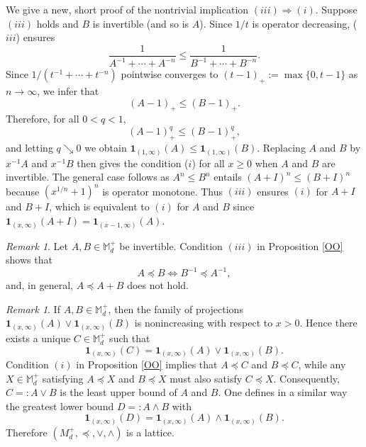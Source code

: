 \documentclass[12pt,reqno]{article}
\theoremstyle{definition}
\theoremstyle{remark}
\newtheorem{remark}[theorem]{Remark}
\numberwithin{equation}{section}
\def\ind{\mathbf{1}}
\def\bM{\mathbb{M}}
\begin{document}
We give a new, short  proof of the nontrivial implication $(iii)\Rightarrow (i)$. Suppose $(iii)$ holds and  $B$ is invertible (and so is $A$).  Since $1/t$ is operator decreasing, ($iii$) ensures
$$
\frac{1}{A^{-1}+\cdots+A^{-n}} \le \frac{1}{B^{-1}+\cdots+B^{-n}}.
$$
Since $1/(t^{-1}+\cdots+ t^{-n})$ pointwise converges to $(t-1)_+:=\max\{0, t-1\}$ as $n\to\infty$, we infer that
$$
(A-1)_+ \le (B-1)_+.
$$
Therefore, for all $0<q<1$,
$$
(A-1)^q_+ \le (B-1)^q_+,
$$
and letting $q\searrow 0$ we obtain $\ind_{(1,\infty)}(A)\le \ind_{(1,\infty)}(B)$. Replacing $A$ and $B$ by $x^{-1}A$ and $x^{-1}B$ then gives the condition ($i$) for all $x\ge 0$ when $A$ and $B$ are invertible. The general case follows as $A^n\le B^n$ entails $(A+ I)^n\le (B+ I)^n$ because $(x^{1/n}+1)^n$ is operator monotone. Thus $(iii)$ ensures $(i)$ for $A+ I$ and  $B+ I$, which is equivalent to $(i)$ for $A$ and $B$ since $\ind_{(x,\infty)}(A+I)=
\ind_{(x-1,\infty)}(A)$.
 


\vskip 5pt
\begin{remark} Let $A,B\in\bM_d^+$ be invertible. Condition $(iii)$ in Proposition \ref{OO} shows that
$$
A\preceq B \iff B^{-1}\preceq A^{-1},
$$
and, in general, $A\preceq A+B$ does not hold.
\end{remark}

\vskip 5pt
\begin{remark} If $A,B\in\bM_d^+$, then the family of projections $\ind_{(x,\infty)}(A) \vee  \ind_{(x,\infty)}(B)$ is nonincreasing with respect to $x>0$. Hence there exists a unique $C\in\bM_d^+$ such that
$$
\ind_{(x,\infty)}(C)=\ind_{(x,\infty)}(A) \vee  \ind_{(x,\infty)}(B).
$$
Condition $(i)$ in Proposition \ref{OO} implies that $A\preceq C$ and $B\preceq C$, while any $X\in\mathbb M_d^+$ satisfying $A\preceq X$ and $B\preceq X$ must also satisfy $C\preceq X$.
 Consequently, $C=:A\vee  B$ is the least upper bound of $A$ and $B$. One defines in a similar way the greatest lower bound $D=:A\wedge B$ with
$$
\ind_{(x,\infty)}(D)=\ind_{(x,\infty)}(A) \wedge  \ind_{(x,\infty)}(B).
$$
Therefore $(M_d^+,\preceq, \vee,\wedge)$ is a lattice.
\end{remark}
\end{document}
